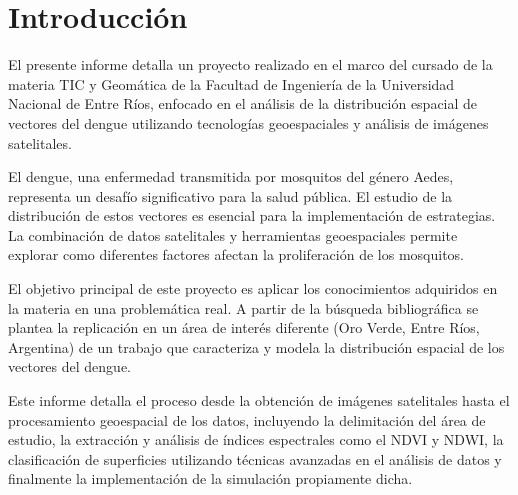 \section{Introducción}

El presente informe detalla un proyecto realizado en el marco del cursado de la materia TIC y Geomática de la Facultad de Ingeniería de la Universidad Nacional de Entre Ríos, enfocado en el análisis de la distribución espacial de vectores del dengue utilizando tecnologías geoespaciales y análisis de imágenes satelitales.

El dengue, una enfermedad transmitida por mosquitos del género Aedes, representa un desafío significativo para la salud pública. El estudio de la distribución de estos vectores es esencial para la implementación de estrategias. La combinación de datos satelitales y herramientas geoespaciales permite explorar como diferentes factores afectan la proliferación de los mosquitos.

El objetivo principal de este proyecto es aplicar los conocimientos adquiridos en la materia en una problemática real. A partir de la búsqueda bibliográfica se plantea la replicación en un área de interés diferente (Oro Verde, Entre Ríos, Argentina) de un trabajo que caracteriza y modela la distribución espacial de los vectores del dengue.

Este informe detalla el proceso desde la obtención de imágenes satelitales hasta el procesamiento geoespacial de los datos, incluyendo la delimitación del área de estudio, la extracción y análisis de índices espectrales como el NDVI y NDWI, la clasificación de superficies utilizando técnicas avanzadas en el análisis de datos y finalmente la implementación de la simulación propiamente dicha.